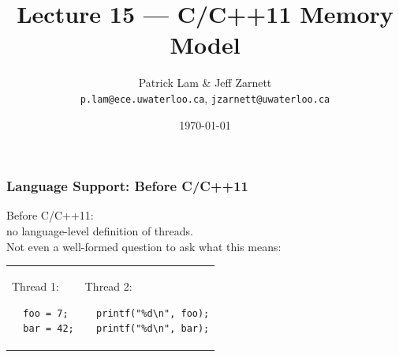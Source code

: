 

\title{Lecture 15 --- C/C++11 Memory Model }

\author{Patrick Lam \& Jeff Zarnett \\ \small \texttt{p.lam@ece.uwaterloo.ca}, \texttt{jzarnett@uwaterloo.ca}}
\date{\today}




\begin{frame}
  \titlepage

 \end{frame}

\begin{frame}[fragile]
  \frametitle{Language Support: Before C/C++11}


  
    Before C/C++11: \\ \qquad no language-level definition of threads.\\[1em]

    Not even a well-formed question to ask what this means:\\[.5em]
    \begin{tabular}{ll}
      \begin{minipage}{.2\textwidth}
        Thread 1:
        \begin{lstlisting}
  foo = 7;
  bar = 42;
        \end{lstlisting}
      \end{minipage} &
      \begin{minipage}{.4\textwidth}
        Thread 2:
        \begin{lstlisting}
  printf("%d\n", foo);
  printf("%d\n", bar);
        \end{lstlisting}
      \end{minipage}
    \end{tabular}
    ~\\[1em]
    
  
\end{frame}

